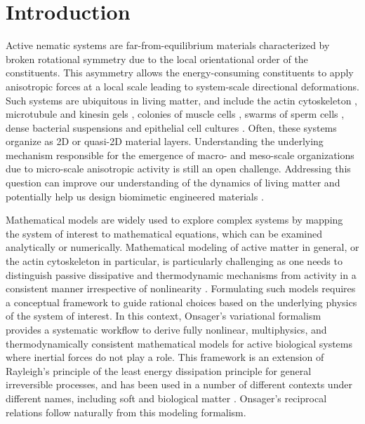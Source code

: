 \section{Introduction}

Active nematic systems are far-from-equilibrium materials characterized by broken rotational symmetry due to the local orientational order of the constituents. This asymmetry allows the energy-consuming constituents to apply anisotropic forces at a local scale leading to system-scale directional deformations. Such systems are ubiquitous in living matter, and include the actin cytoskeleton \cite{chugh2018}, microtubule and kinesin gels \cite{ndlec1997}, colonies of muscle cells \cite{duclos2014,guillamat2020}, swarms of sperm cells \cite{creppy2015},  dense bacterial suspensions \cite{qi2022, gachelin2014} and epithelial cell cultures \cite{maroudas2021,blanch2018,saw2017}. Often, these systems organize as 2D or quasi-2D material layers.
Understanding the underlying mechanism responsible for the emergence of macro- and meso-scale organizations due to micro-scale anisotropic activity is still an open challenge. Addressing this question can improve our understanding of the dynamics of living matter and potentially help us design biomimetic engineered materials \cite{fratzl2007}.

Mathematical models are widely used to explore complex systems by mapping the system of interest to mathematical equations, which can be examined analytically or numerically. Mathematical modeling of active matter in general, or the actin cytoskeleton in particular, is particularly challenging as one needs to distinguish passive dissipative and thermodynamic mechanisms from activity in a consistent manner irrespective of nonlinearity \cite{Prost:2015aa}. Formulating such models  requires a conceptual framework to guide  rational choices based on the underlying physics of the system of interest. In this context, Onsager's variational formalism provides a systematic workflow to derive fully nonlinear, multiphysics, and thermodynamically consistent mathematical models for active biological systems where inertial forces do not play a role. This framework is an extension of Rayleigh’s principle of the least energy dissipation principle \cite{Rayleigh1873} for general irreversible processes, and has been used in a number of different contexts under different names, including soft and biological matter \cite{doi2011,doi2012,arroyo2018,torres2019}.  Onsager's reciprocal relations  \cite{Onsager1931} follow naturally from this modeling formalism.


